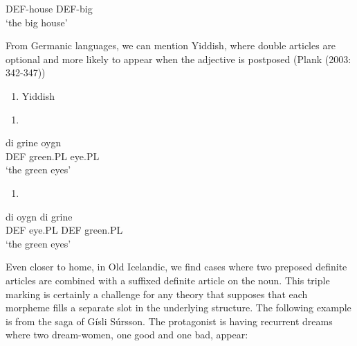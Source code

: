 DEF-house  DEF-big\\ %


‘the big house’
\z


From Germanic languages, we can mention Yiddish, where double articles are optional and more likely to appear when the adjective is postposed (Plank (2003: 342-347))

\begin{enumerate} %
\item 
Yiddish

\end{enumerate} %
\setcounter{listLFOxcviiileveli}{0}
\begin{enumerate} %
\item 
\end{enumerate} %
\ea\label{}
\gll di  grine  oygn\\


DEF  green.PL  eye.PL\\ %


‘the green eyes’
\z


\begin{enumerate} %
\item 
\end{enumerate} %
\ea\label{}
\gll di  oygn  di   grine\\


DEF  eye.PL  DEF  green.PL\\ %


‘the green eyes’
\z


Even closer to home, in Old Icelandic, we find cases where two preposed definite articles are combined with a suffixed definite article on the noun. This triple marking is certainly a challenge for any theory that supposes that each morpheme fills a separate slot in the underlying structure. The following example is from the saga of Gísli Súrsson. The protagonist is having recurrent dreams where two dream-women, one good and one bad, appear: 

